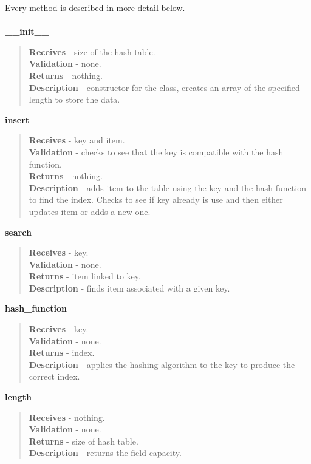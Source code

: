 \documentclass[titlepage]{article}
\begin{document}
Every method is described in more detail below. \\\\

\textbf{\_\_init\_\_}
\begin{quote}
\textbf{Receives} - size of the hash table. \\
\textbf{Validation} - none.\\
\textbf{Returns} - nothing. \\
\textbf{Description} - constructor for the class, creates an array of the specified length to store the data.
\end{quote}

\textbf{insert}
\begin{quote}
\textbf{Receives} - key and item. \\
\textbf{Validation} - checks to see that the key is compatible with the hash function.\\
\textbf{Returns} - nothing. \\
\textbf{Description} - adds item to the table using the key and the hash function to find the index. Checks to see if key already is use and then either updates item or adds a new one. 
\end{quote}

\textbf{search}
\begin{quote}
\textbf{Receives} - key. \\
\textbf{Validation} - none.\\
\textbf{Returns} - item linked to key. \\
\textbf{Description} - finds item associated with a given key.
\end{quote}

\textbf{hash\_function}
\begin{quote}
\textbf{Receives} - key. \\
\textbf{Validation} - none.\\
\textbf{Returns} - index. \\
\textbf{Description} - applies the hashing algorithm to the key to produce the correct index.
\end{quote}

\textbf{length}
\begin{quote}
\textbf{Receives} - nothing. \\
\textbf{Validation} - none.\\
\textbf{Returns} - size of hash table. \\
\textbf{Description} - returns the field capacity.
\end{quote}
\end{document}
